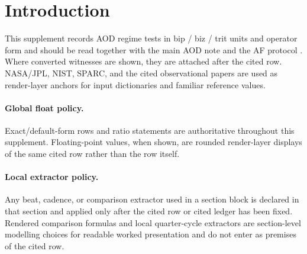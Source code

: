 \section{Introduction}
This supplement records AOD regime tests in bip / biz / trit units and operator form and should be read together with the main AOD note and the AF protocol \cite{aod43_main_2026,af_protocol_2025}. Where converted witnesses are shown, they are attached after the cited row. NASA/JPL, NIST, SPARC, and the cited observational papers are used as render-layer anchors for input dictionaries and familiar reference values.

\paragraph{Global float policy.} Exact/default-form rows and ratio statements are authoritative throughout this supplement. Floating-point values, when shown, are rounded render-layer displays of the same cited row rather than the row itself.

\paragraph{Local extractor policy.} Any beat, cadence, or comparison extractor used in a section block is declared in that section and applied only after the cited row or cited ledger has been fixed. Rendered comparison formulas and local quarter-cycle extractors are section-level modelling choices for readable worked presentation and do not enter as premises of the cited row.
